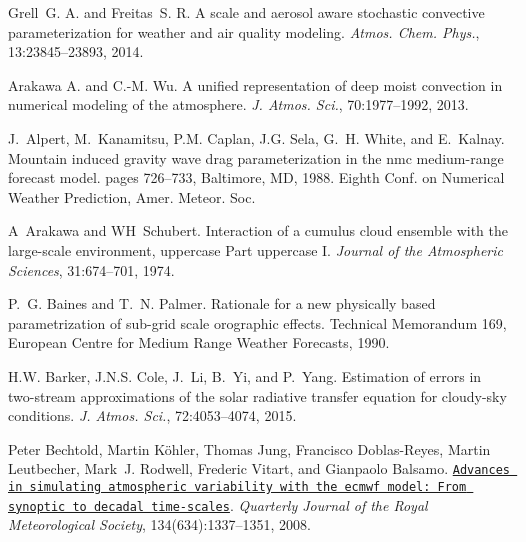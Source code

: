 
\begin{DoxyDescription}
\item[\label{_CITEREF_grell_and_freitus_2014}%
\mbox{[}1\mbox{]}]Grell~G. A. and Freitas~S. R. A scale and aerosol aware stochastic convective parameterization for weather and air quality modeling. {\itshape Atmos. Chem. Phys.}, 13\+:23845--23893, 2014.


\item[\label{_CITEREF_arakawa_and_wu_2013}%
\mbox{[}2\mbox{]}]Arakawa A. and C.-\/M. Wu. A unified representation of deep moist convection in numerical modeling of the atmosphere. {\itshape J. Atmos. Sci.}, 70\+:1977--1992, 2013.


\item[\label{_CITEREF_alpert_et_al_1988}%
\mbox{[}3\mbox{]}]J.~Alpert, M.~Kanamitsu, P.\+M. Caplan, J.\+G. Sela, G.~H. White, and E.~Kalnay. Mountain induced gravity wave drag parameterization in the nmc medium-\/range forecast model. pages 726--733, Baltimore, MD, 1988. Eighth Conf. on Numerical Weather Prediction, Amer. Meteor. Soc.


\item[\label{_CITEREF_arakawa_and_schubert_1974}%
\mbox{[}4\mbox{]}]A~Arakawa and WH~Schubert. Interaction of a cumulus cloud ensemble with the large-\/scale environment, uppercase Part uppercase I. {\itshape Journal of the Atmospheric Sciences}, 31\+:674--701, 1974.


\item[\label{_CITEREF_baines_and_palmer_1990}%
\mbox{[}5\mbox{]}]P.~G. Baines and T.~N. Palmer. Rationale for a new physically based parametrization of sub-\/grid scale orographic effects. Technical Memorandum 169, European Centre for Medium Range Weather Forecasts, 1990.


\item[\label{_CITEREF_barker_et_al_2015}%
\mbox{[}6\mbox{]}]H.\+W. Barker, J.\+N.\+S. Cole, J.~Li, B.~Yi, and P.~Yang. Estimation of errors in two-\/stream approximations of the solar radiative transfer equation for cloudy-\/sky conditions. {\itshape J. Atmos. Sci.}, 72\+:4053--4074, 2015.


\item[\label{_CITEREF_bechtold_et_al_2008}%
\mbox{[}7\mbox{]}]Peter Bechtold, Martin K\"{o}hler, Thomas Jung, Francisco Doblas-\/\+Reyes, Martin Leutbecher, Mark~J. Rodwell, Frederic Vitart, and Gianpaolo Balsamo. \href{http://dx.doi.org/10.1002/qj.289}{\tt Advances in simulating atmospheric variability with the ecmwf model\+: From synoptic to decadal time-\/scales}. {\itshape Quarterly Journal of the Royal Meteorological Society}, 134(634)\+:1337--1351, 2008. 



\end{DoxyDescription}
